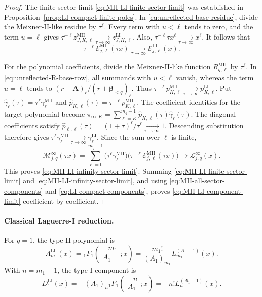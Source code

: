 \documentclass[10pt]{amsart}
\newcommand{\A}{\boldsymbol A}
\newcommand{\bbeta}{\boldsymbol\beta}
\newcommand{\fall}[2]{#1^{\underline{#2}}}
\newcommand{\pFq}[5]{{}_{#1}F_{#2}\!\left(\begin{matrix}#3\\#4\end{matrix};#5\right)}
\theoremstyle{plain}
\theoremstyle{definition}
\theoremstyle{remark}
\begin{document}
\begin{proof}
The finite-sector limit
\eqref{eq:MII-LI-finite-sector-limit} was established in
Proposition~\ref{prop:LI-compact-finite-poles}. In
\eqref{eq:unreflected-base-residue}, divide the
Meixner-II-like residue by \(\tau^\ell\). Every term with \(u<\ell\)
tends to zero, and the term \(u=\ell\) gives
\(\tau^{-\ell}z_{J,K,\ell}^{\mathrm{MII}}
\xrightarrow[\tau\to\infty]{}z_{J,K,\ell}^{\mathrm{LI}}\).
Also,
\(\tau^{-\ell}\fall{\tau x}{\ell}
\xrightarrow[\tau\to\infty]{}x^\ell\).  It follows that
\begin{equation}
 \tau^{-\ell}\mathcal E_{j,\ell}^{\mathrm{MII}}(\tau x)
 \xrightarrow[\tau\to\infty]{}\mathcal E_{j,\ell}^{\mathrm{LI}}(x).
 \label{eq:MII-LI-infinity-vector-limit}
\end{equation}

For the polynomial coefficients, divide the Meixner-II-like function
\(R_{q,\ell}^{\mathrm{MII}}\) by
\(\tau^\ell\).  In
\eqref{eq:unreflected-R-base-row}, all summands with \(u<\ell\) vanish,
whereas the term \(u=\ell\) tends to
\((r+\A)_\ell/(r+\bbeta_{<q})_\ell\). Thus
\(\tau^{-\ell}p_{K,\ell}^{\mathrm{MII}}
\xrightarrow[\tau\to\infty]{}p_{K,\ell}^{\mathrm{LI}}\).
Put
\(\widehat\gamma_\ell(\tau)=
 \tau^\ell\gamma_\ell^{\mathrm{MII}}\) and
\(\widehat p_{K,\ell}(\tau)=
 \tau^{-\ell}p_{K,\ell}^{\mathrm{MII}}\).  The coefficient identities
for the target polynomial become
\(\pi_{\infty,K}
=\sum_{\ell=K}^{m_q-1}
\widehat p_{K,\ell}(\tau)\widehat\gamma_\ell(\tau)\).
The diagonal coefficients satisfy
\(\widehat p_{\ell,\ell}(\tau)=(1+\tau)^\ell/\tau^\ell
\xrightarrow[\tau\to\infty]{}1\).
Descending substitution therefore gives
\(\tau^\ell\gamma_\ell^{\mathrm{MII}}\xrightarrow[\tau\to\infty]{}
\gamma_\ell^{\mathrm{LI}}\).
Since the sum over \(\ell\) is finite,
\[
 \mathscr M_{j,q}^{\infty}(\tau x)
 =\sum_{\ell=0}^{m_q-1}
 \bigl(\tau^\ell\gamma_\ell^{\mathrm{MII}}\bigr)
 \bigl(\tau^{-\ell}
       \mathcal E_{j,\ell}^{\mathrm{MII}}(\tau x)\bigr)
 \longrightarrow \mathscr L_{j,q}^{\infty}(x).
\]
This proves \eqref{eq:MII-LI-infinity-sector-limit}. Summing
\eqref{eq:MII-LI-finite-sector-limit} and
\eqref{eq:MII-LI-infinity-sector-limit}, and using
\eqref{eq:MII-all-sector-components} and
\eqref{eq:LI-compact-components}, proves
\eqref{eq:MII-LI-component-limit} coefficient by coefficient.
\end{proof}

\paragraph{Classical Laguerre-I reduction.}
For \(q=1\), the type-II polynomial is
\begin{equation}
 A_{m_1}^{\mathrm{LI}}(x)
 =\pFq{1}{1}{-m_1}{A_1}{x}
 =\frac{m_1!}{(A_1)_{m_1}}L_{m_1}^{(A_1-1)}(x).
 \label{eq:q1-LI-A}
\end{equation}
With \(n=m_1-1\), the type-I component is
\begin{equation}
 D_1^{\mathrm{LI}}(x)
 =-(A_1)_n\pFq{1}{1}{-n}{A_1}{x}
 =-n!L_n^{(A_1-1)}(x).
 \label{eq:q1-LI-B}
\end{equation}
\end{document}
